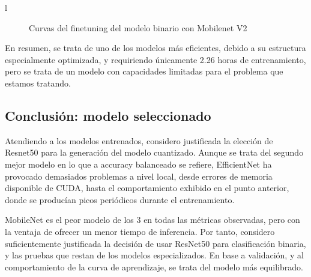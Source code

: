l\begin{figure}[H]
	\centering
	\caption{Curvas del finetuning del modelo binario con Mobilenet V2}
	\label{fig:curvasmbin}
\end{figure}

En resumen, se trata de uno de los modelos más eficientes,    debido a su estructura especialmente optimizada, y requiriendo únicamente 2.26 horas de entrenamiento, pero se trata de un modelo con capacidades limitadas para el problema que estamos tratando.

\subsection{Conclusión: modelo seleccionado}

Atendiendo a los modelos entrenados, considero justificada la elección de Resnet50 para la generación del modelo cuantizado. Aunque se trata del segundo mejor modelo en lo que a accuracy balanceado se refiere, EfficientNet ha provocado demasiados problemas a nivel local, desde errores de memoria disponible de CUDA, hasta el comportamiento exhibido en el punto anterior, donde se producían picos periódicos durante el entrenamiento.

MobileNet es el peor modelo de los 3 en todas las métricas observadas, pero con la ventaja de ofrecer un menor tiempo de inferencia. Por tanto, considero suficientemente justificada la decisión de usar ResNet50 para clasificación binaria, y las pruebas que restan de los modelos especializados. En base a validación, y al comportamiento de la curva de aprendizaje, se trata del modelo más equilibrado.

